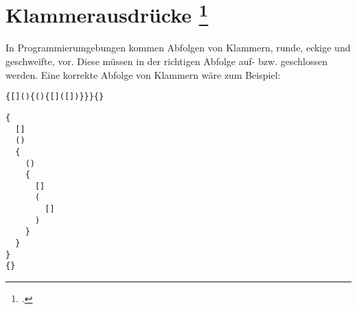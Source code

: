 \documentclass{lehramt-informatik-aufgabe}
\begin{document}
\section{Klammerausdrücke
\footcite{theo:ab:2}}

In Programmierumgebungen kommen Abfolgen von Klammern, runde, eckige und
geschweifte, vor. Diese müssen in der richtigen Abfolge auf- bzw.
geschlossen werden. Eine korrekte Abfolge von Klammern wäre zum
Beispiel:

\begin{verbatim}
{[](){(){[]([])}}}{}
\end{verbatim}

\begin{verbatim}
{
  []
  ()
  {
    ()
    {
      []
      (
        []
      )
    }
  }
}
{}
\end{verbatim}
\end{document}
